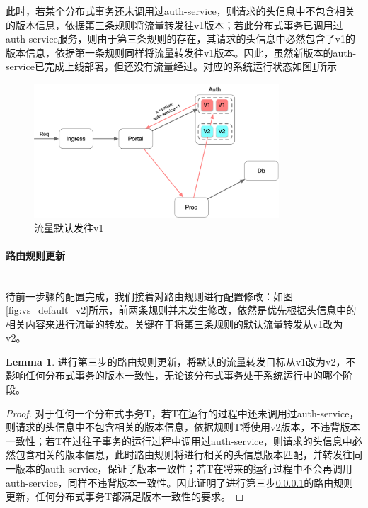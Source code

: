 \documentclass[a4paper, 12pt]{article}
\theoremstyle{definition}
\newtheorem{lemma}{Lemma}
\begin{document}
此时，若某个分布式事务还未调用过auth-service，则请求的头信息中不包含相关的版本信息，依据第三条规则将流量转发往v1版本；若此分布式事务已调用过auth-service服务，则由于第三条规则的存在，其请求的头信息中必然包含了v1的版本信息，依据第一条规则同样将流量转发往v1版本。因此，虽然新版本的auth-service已完成上线部署，但还没有流量经过。对应的系统运行状态如图\ref{fig:traffic_default_v1}所示
\begin{figure}[!ht]
 \centering
 \includegraphics[height=5cm]{images/traffic_default_v1.png}
 \caption{流量默认发往v1}
 \label{fig:traffic_default_v1}
\end{figure}

\paragraph{路由规则更新}\label{section:update_route}\mbox{}\\

待前一步骤的配置完成，我们接着对路由规则进行配置修改：如图\ref{fig:vs_default_v2}所示，前两条规则并未发生修改，依然是优先根据头信息中的相关内容来进行流量的转发。关键在于将第三条规则的默认流量转发从v1改为v2。

\begin{lemma}
进行第三步的路由规则更新，将默认的流量转发目标从v1改为v2，不影响任何分布式事务的版本一致性，无论该分布式事务处于系统运行中的哪个阶段。
\end{lemma}

\begin{proof}
对于任何一个分布式事务T，若T在运行的过程中还未调用过auth-service，则请求的头信息中不包含相关的版本信息，依据规则T将使用v2版本，不违背版本一致性；若T在过往子事务的运行过程中调用过auth-service，则请求的头信息中必然包含相关的版本信息，此时路由规则将进行相关的头信息版本匹配，并转发往同一版本的auth-service，保证了版本一致性；若T在将来的运行过程中不会再调用auth-service，同样不违背版本一致性。因此证明了进行第三步\ref{section:update_route}的路由规则更新，任何分布式事务T都满足版本一致性的要求。
\end{proof}
\end{document}
